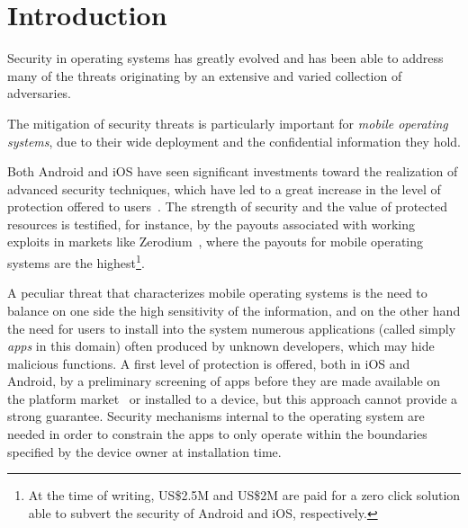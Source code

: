 \section{Introduction}
\label{sect:seapp_introduction}

Security in operating systems has greatly evolved and has been able to
address many of the threats originating by an extensive and varied
collection of adversaries.

The mitigation of security threats is particularly important
for {\em mobile operating systems}, due to their wide deployment and
the confidential information they hold.

Both Android and iOS have seen significant investments toward the
realization of advanced security techniques, which have led to a great
increase in the level of protection offered to
users~\cite{seapp_tapsm_m}.  The strength of security and the value of
protected resources is testified, for instance, by the payouts
associated with working exploits in markets like
Zerodium~\cite{seapp_zerodium}, where the payouts for mobile operating
systems are the highest\footnote{At the time of writing, US\$2.5M and
  US\$2M are paid for a zero click solution able to subvert the
  security of Android and iOS, respectively. }.

A peculiar threat that characterizes mobile operating systems is the
need to balance on one side the high sensitivity of the information,
and on the other hand the need for users to install into the system
numerous applications (called simply {\em apps} in this domain)
often produced by unknown developers, which may hide malicious
functions.  A first level of protection is offered, both in iOS and
Android, by a preliminary screening of apps before they are made
available on the platform market~\cite{seapp_playprotect} or installed
to a device, but this approach cannot provide a strong guarantee.
Security mechanisms internal to the operating system are needed in
order to constrain the apps to only operate within the boundaries
specified by the device owner at installation time.

